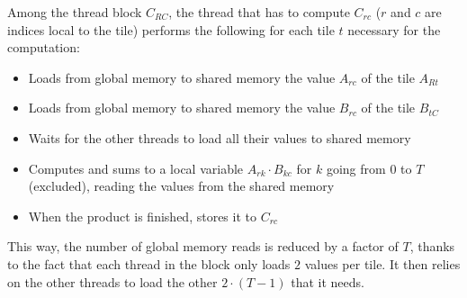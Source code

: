 Among the thread block $C_{RC}$, the thread that has to compute $C_{rc}$ ($r$ and $c$ are indices local to the tile) performs the following for each tile $t$ necessary for the computation:
\begin{itemize}
	\itemsep 0em
	\item Loads from global memory to shared memory the value $A_{rc}$ of the tile $A_{Rt}$
	\item Loads from global memory to shared memory the value $B_{rc}$ of the tile $B_{tC}$
	\item Waits for the other threads to load all their values to shared memory
	\item Computes and sums to a local variable $A_{rk} \cdot B_{kc}$ for $k$ going from $0$ to $T$ (excluded), reading the values from the shared memory
	\item When the product is finished, stores it to $C_{rc}$
\end{itemize}

This way, the number of global memory reads is reduced by a factor of $T$, thanks to the fact that each thread in the block only loads $2$ values per tile.
It then relies on the other threads to load the other $2\cdot(T-1)$ that it needs.
